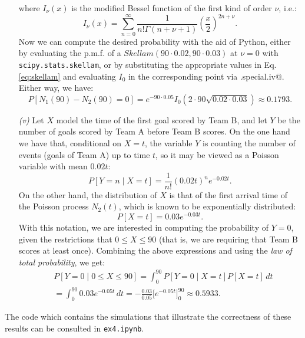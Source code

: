 \begin{enumerate}
        where $I_\nu(x)$ is the modified Bessel function of the first kind of order \( \nu \), i.e.:
\[
  I_{\nu}(x) = \sum_{n=0}^{\infty} \frac{1}{n! \Gamma(n + \nu + 1)}\left( \frac{x}{2} \right)^{2n + \nu}.
\]
Now we can compute the desired probability with the aid of Python, either by evaluating the p.m.f. of a $Skellam(90\cdot 0.02, 90\cdot 0.03)$ at $\nu=0$ with \verb|scipy.stats.skellam|, or by substituting the appropriate values in Eq. \eqref{eq:skellam} and evaluating $I_0$ in the corresponding point via \verb@scipy.special.iv@. Either way, we have:
\[
P[N_1(90)- N_2(90) = 0]=e^{-90\cdot 0.05}I_0(2\cdot 90\sqrt{0.02\cdot 0.03}) \approx 0.1793.
\]
  \item[\textit{(v)}] Let $X$ model the time of the first goal scored by Team B, and let $Y$ be the number of goals scored by Team A before Team B scores. On the one hand we have that, conditional on $X=t$, the variable $Y$ is counting the number of events (goals of Team A) up to time $t$, so it may be viewed as a Poisson variable with mean $0.02t$:
  \[
  P[Y=n\mid X=t]=\frac{1}{n!}(0.02t)^n e^{-0.02t}.
  \]
  On the other hand, the distribution of $X$ is that of the first arrival time of the Poisson process $N_2(t)$, which is known to be exponentially distributed:
  \[
  P[X=t]= 0.03e^{-0.03t}.
  \]
  With this notation, we are interested in computing the probability of $Y=0$, given the restrictions that $0\leq X\leq 90$ (that is, we are requiring that Team B scores at least once). Combining the above expressions and using the \textit{law of total probability}, we get:
  \[
  \begin{aligned}
  &P[Y=0\mid0\leq X \leq 90]=\int_0^{90} P[Y=0\mid X=t]P[X=t]\, dt\\
  &=  \int_0^{90}0.03 e^{-0.05t}\, dt= -\frac{0.03}{0.05}\Big[ e^{-0.05t}\Big]_0^{90} \approx 0.5933.
\end{aligned}
  \]
\end{enumerate}

The code which contains the simulations that illustrate the correctness of these results can be consulted in \verb|ex4.ipynb|.
